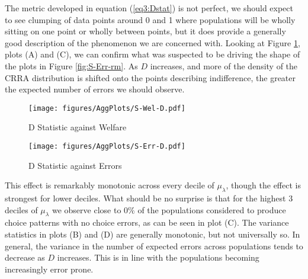 \documentclass[../main.tex]{subfiles}
\begin{document}
The metric developed in equation (\ref{eq3:Dstat}) is not perfect, we should expect to see clumping of data points around 0 and 1 where populations will be wholly sitting on one point or wholly between points, but it does provide a generally good description of the phenomenon we are concerned with.
Looking at Figure \ref{fig:D-Wel-smooth}, plots (A) and (C), we can confirm what was suspected to be driving the shape of the plots in Figure \ref{fig:S-Err-rm}.
As $D$ increases, and more of the density of the CRRA distribution is shifted onto the points describing indifference, the greater the expected number of errors we should observe.

\begin{figure}[h!]
	\center
	\caption{D Statistic against Welfare}
	\texttt{[image: figures/AggPlots/S-Wel-D.pdf]}
	\label{fig:D-Wel-smooth}
\end{figure}

\begin{figure}[h!]
	\center
	\caption{D Statistic against Errors}
	\texttt{[image: figures/AggPlots/S-Err-D.pdf]}
	\label{fig:D-Err-smooth}
\end{figure}

This effect is remarkably monotonic across every decile of $\mu_\lambda$, though the effect is strongest for lower deciles.
What should be no surprise is that for the highest 3 deciles of $\mu_\lambda$ we observe close to $0\%$ of the populations considered to produce choice patterns with no choice errors, as can be seen in plot (C).
The variance statistics in plots (B) and (D) are generally monotonic, but not universally so.
In general, the variance in the number of expected errors across populations tends to decrease as $D$ increases.
This is in line with the populations becoming increasingly error prone.
\end{document}

